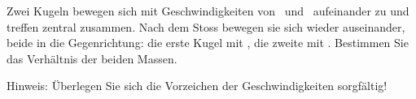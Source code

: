 Zwei Kugeln bewegen sich mit Geschwindigkeiten von \vEaO\ und \vZaO\ aufeinander zu und treffen zentral zusammen. Nach dem Stoss bewegen sie sich wieder auseinander, beide in die Gegenrichtung: die erste Kugel mit \vEeO, die zweite mit \vZeO. Bestimmen Sie das Verhältnis der beiden Massen.

Hinweis: Überlegen Sie sich die Vorzeichen der Geschwindigkeiten sorgfältig!
